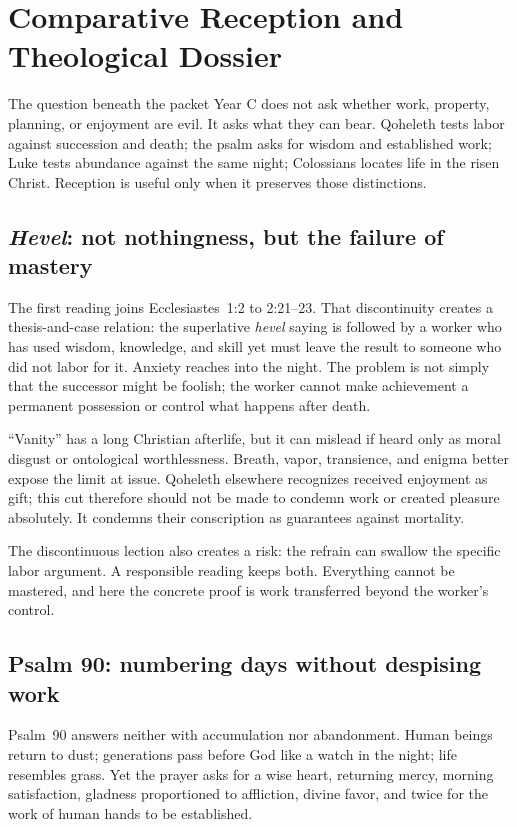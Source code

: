 \section*{Comparative Reception and Theological Dossier}

\begin{studybox}{The question beneath the packet}
Year C does not ask whether work, property, planning, or enjoyment are evil.
It asks what they can bear. Qoheleth tests labor against succession and death;
the psalm asks for wisdom and established work; Luke tests abundance against
the same night; Colossians locates life in the risen Christ. Reception is
useful only when it preserves those distinctions.
\end{studybox}

\subsection*{\emph{Hevel}: not nothingness, but the failure of mastery}

The first reading joins Ecclesiastes~1:2 to 2:21--23. That discontinuity creates
a thesis-and-case relation: the superlative \emph{hevel} saying is followed by
a worker who has used wisdom, knowledge, and skill yet must leave the result
to someone who did not labor for it. Anxiety reaches into the night. The
problem is not simply that the successor might be foolish; the worker cannot
make achievement a permanent possession or control what happens after death.

“Vanity” has a long Christian afterlife, but it can mislead if heard only as
moral disgust or ontological worthlessness. Breath, vapor, transience, and
enigma better expose the limit at issue. Qoheleth elsewhere recognizes
received enjoyment as gift; this cut therefore should not be made to condemn
work or created pleasure absolutely. It condemns their conscription as
guarantees against mortality.

The discontinuous lection also creates a risk: the refrain can swallow the
specific labor argument. A responsible reading keeps both. Everything cannot
be mastered, and here the concrete proof is work transferred beyond the
worker's control.

\subsection*{Psalm 90: numbering days without despising work}

Psalm~90 answers neither with accumulation nor abandonment. Human beings return
to dust; generations pass before God like a watch in the night; life resembles
grass. Yet the prayer asks for a wise heart, returning mercy, morning
satisfaction, gladness proportioned to affliction, divine favor, and twice for
the work of human hands to be established.

